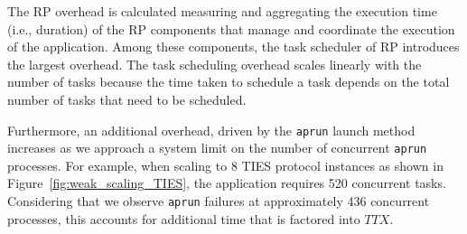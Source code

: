 The RP overhead is calculated measuring and aggregating the execution time
(i.e., duration) of the RP components that manage and coordinate the
execution of the application. Among these components, the task scheduler of
RP introduces the largest overhead. The task scheduling overhead scales
linearly with the number of tasks because the time taken to schedule a task
depends on the total number of tasks that need to be scheduled. 


Furthermore, an additional overhead, driven by the \texttt{aprun} launch
method increases as we approach a system limit on the number of concurrent
\texttt{aprun} processes. For example, when scaling to 8 TIES protocol
instances as shown in Figure~\ref{fig:weak_scaling_TIES}, the application
requires 520 concurrent tasks. Considering that we observe \texttt{aprun}
failures at approximately 436 concurrent processes, this accounts for
additional time that is factored into \(TTX\).  


